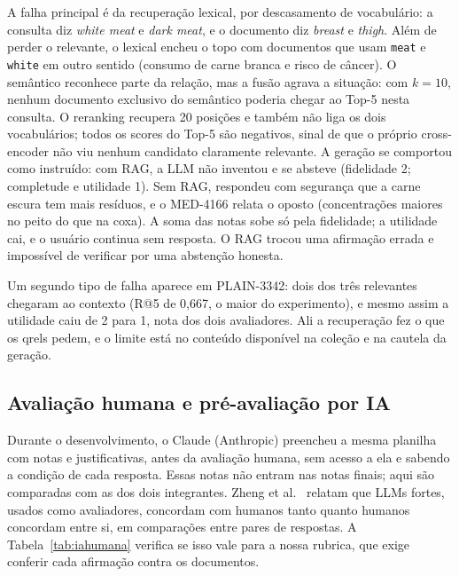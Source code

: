 \documentclass[11pt,a4paper]{article}
\newcommand{\cod}[1]{\texttt{#1}}
\begin{document}
A falha principal é da recuperação lexical, por descasamento de vocabulário: a consulta diz \emph{white meat} e \emph{dark meat}, e o documento diz \emph{breast} e \emph{thigh}. Além de perder o relevante, o lexical encheu o topo com documentos que usam \cod{meat} e \cod{white} em outro sentido (consumo de carne branca e risco de câncer). O semântico reconhece parte da relação, mas a fusão agrava a situação: com $k=10$, nenhum documento exclusivo do semântico poderia chegar ao Top-5 nesta consulta. O reranking recupera 20 posições e também não liga os dois vocabulários; todos os scores do Top-5 são negativos, sinal de que o próprio cross-encoder não viu nenhum candidato claramente relevante. A geração se comportou como instruído: com RAG, a LLM não inventou e se absteve (fidelidade 2; completude e utilidade 1). Sem RAG, respondeu com segurança que a carne escura tem mais resíduos, e o MED-4166 relata o oposto (concentrações maiores no peito do que na coxa). A soma das notas sobe só pela fidelidade; a utilidade cai, e o usuário continua sem resposta. O RAG trocou uma afirmação errada e impossível de verificar por uma abstenção honesta.

Um segundo tipo de falha aparece em PLAIN-3342: dois dos três relevantes chegaram ao contexto (R@5 de 0,667, o maior do experimento), e mesmo assim a utilidade caiu de 2 para 1, nota dos dois avaliadores. Ali a recuperação fez o que os qrels pedem, e o limite está no conteúdo disponível na coleção e na cautela da geração.

\FloatBarrier
\subsection{Avaliação humana e pré-avaliação por IA}
\label{sec:ia-humana}

Durante o desenvolvimento, o Claude (Anthropic) preencheu a mesma planilha com notas e justificativas, antes da avaliação humana, sem acesso a ela e sabendo a condição de cada resposta. Essas notas não entram nas notas finais; aqui são comparadas com as dos dois integrantes. Zheng et al.~\cite{zheng2023} relatam que LLMs fortes, usados como avaliadores, concordam com humanos tanto quanto humanos concordam entre si, em comparações entre pares de respostas. A Tabela~\ref{tab:iahumana} verifica se isso vale para a nossa rubrica, que exige conferir cada afirmação contra os documentos.
\end{document}
